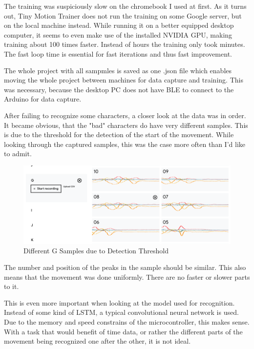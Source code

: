 \documentclass[a4paper,titlepage]{article}
\begin{document}
The training was suspiciously slow on the chromebook I used at first.
As it turns out, Tiny Motion Trainer does not run the training on some Google server, but on the local machine instead.
While running it on a better equipped desktop computer, it seems to even make use of the installed NVIDIA GPU, making training about 100 times faster.
Instead of hours the training only took minutes.
The fast loop time is essential for fast iterations and thus fast improvement.

The whole project with all sampmles is saved as one .json file which enables moving the whole project between machines for data capture and training.
This was necessary, because the desktop PC does not have BLE to connect to the Arduino for data capture.

After failing to recognize some characters, a closer look at the data was in order.
It became obvious, that the "bad" characters do have very different samples.
This is due to the threshold for the detection of the start of the movement.
While looking through the captured samples, this was the case more often than I'd like to admit.

\begin{figure}[H]
    \includegraphics[width=\textwidth]{different_samples_not_good.png}
    \caption{Different G Samples due to Detection Threshold}
\end{figure}

The number and position of the peaks in the sample should be similar.
This also means that the movement was done uniformly.
There are no faster or slower parts to it.

This is even more important when looking at the model used for recognition.
Instead of some kind of LSTM, a typical convolutional neural network is used.
Due to the memory and speed constrains of the microcontroller, this makes sense.
With a task that would benefit of time data, or rather the different parts of the movement being recognized one after the other, it is not ideal.
\end{document}
